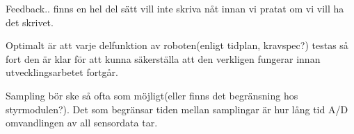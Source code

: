 \documentclass[11pt]{article}
\begin{document}
\begin{flushleft}
Feedback.. finns en hel del sätt vill inte skriva nåt innan vi pratat om vi vill ha det skrivet.

Optimalt är att varje delfunktion av roboten(enligt tidplan, kravspec?) testas så fort den är klar för att kunna säkerställa att den verkligen fungerar innan utvecklingsarbetet fortgår.

Sampling bör ske så ofta som möjligt(eller finns det begränsning hos styrmodulen?). Det som begränsar tiden mellan samplingar är hur lång tid A/D omvandlingen av all sensordata tar.




\pagebreak
{}



\end{flushleft}
\end{document}
